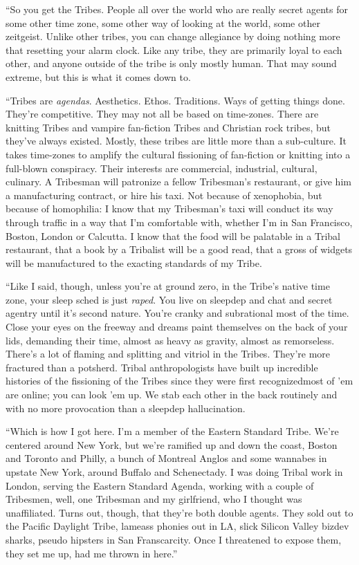 “So you get the Tribes. People all over the world who are really
secret agents for some other time zone, some other way of looking
at the world, some other zeitgeist. Unlike other tribes, you can
change allegiance by doing nothing more that resetting your alarm
clock. Like any tribe, they are primarily loyal to each other, and
anyone outside of the tribe is only mostly human. That may sound
extreme, but this is what it comes down to.

“Tribes are \emph{agendas}. Aesthetics. Ethos. Traditions. Ways of
getting things done. They’re competitive. They may not all be based
on time-zones. There are knitting Tribes and vampire fan-fiction
Tribes and Christian rock tribes, but they’ve always existed.
Mostly, these tribes are little more than a sub-culture. It takes
time-zones to amplify the cultural fissioning of fan-fiction or
knitting into a full-blown conspiracy. Their interests are
commercial, industrial, cultural, culinary. A Tribesman will
patronize a fellow Tribesman’s restaurant, or give him a
manufacturing contract, or hire his taxi. Not because of
xenophobia, but because of homophilia: I know that my Tribesman’s
taxi will conduct its way through traffic in a way that I’m
comfortable with, whether I’m in San Francisco, Boston, London or
Calcutta. I know that the food will be palatable in a Tribal
restaurant, that a book by a Tribalist will be a good read, that a
gross of widgets will be manufactured to the exacting standards of
my Tribe.

“Like I said, though, unless you’re at ground zero, in the Tribe’s
native time zone, your sleep sched is just \emph{raped}. You live
on sleepdep and chat and secret agentry until it’s second nature.
You’re cranky and subrational most of the time. Close your eyes on
the freeway and dreams paint themselves on the back of your lids,
demanding their time, almost as heavy as gravity, almost as
remorseless. There’s a lot of flaming and splitting and vitriol in
the Tribes. They’re more fractured than a potsherd. Tribal
anthropologists have built up incredible histories of the
fissioning of the Tribes since they were first recognized{\dash}most of
’em are online; you can look ’em up. We stab each other in the back
routinely and with no more provocation than a sleepdep
hallucination.

“Which is how I got here. I’m a member of the Eastern Standard
Tribe. We’re centered around New York, but we’re ramified up and
down the coast, Boston and Toronto and Philly, a bunch of Montreal
Anglos and some wannabes in upstate New York, around Buffalo and
Schenectady. I was doing Tribal work in London, serving the Eastern
Standard Agenda, working with a couple of Tribesmen, well, one
Tribesman and my girlfriend, who I thought was unaffiliated. Turns
out, though, that they’re both double agents. They sold out to the
Pacific Daylight Tribe, lameass phonies out in LA, slick Silicon
Valley bizdev sharks, pseudo hipsters in San Franscarcity. Once I
threatened to expose them, they set me up, had me thrown in here.”

